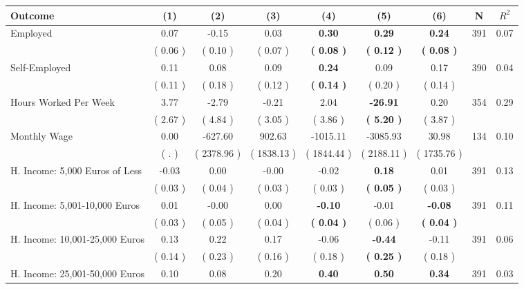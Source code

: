 \begin{tabular}{lcccccccc}
\toprule
 \textbf{Outcome} & \textbf{(1)} & \textbf{(2)} & \textbf{(3)} & \textbf{(4)} & \textbf{(5)} & \textbf{(6)} & \textbf{N} & \textbf{$ R^2$} \\
\midrule
Employed &      0.07 &     -0.15 &      0.03 & \textbf{     0.30} & \textbf{     0.29} & \textbf{     0.24} & 391 &       0.07 \\ 
 & (     0.06 ) & (     0.10 ) & (     0.07 ) & \textbf{(     0.08 )} & \textbf{(     0.12 )} & \textbf{(     0.08 )} & \\
Self-Employed &      0.11 &      0.08 &      0.09 & \textbf{     0.24} &      0.09 &      0.17 & 390 &       0.04 \\ 
 & (     0.11 ) & (     0.18 ) & (     0.12 ) & \textbf{(     0.14 )} & (     0.20 ) & (     0.14 ) & \\
Hours Worked Per Week &      3.77 &     -2.79 &     -0.21 &      2.04 & \textbf{   -26.91} &      0.20 & 354 &       0.29 \\ 
 & (     2.67 ) & (     4.84 ) & (     3.05 ) & (     3.86 ) & \textbf{(     5.20 )} & (     3.87 ) & \\
Monthly Wage &      0.00 &   -627.60 &    902.63 &  -1015.11 &  -3085.93 &     30.98 & 134 &       0.10 \\ 
 & (        . ) & (  2378.96 ) & (  1838.13 ) & (  1844.44 ) & (  2188.11 ) & (  1735.76 ) & \\
H. Income: 5,000 Euros of Less &     -0.03 &      0.00 &     -0.00 &     -0.02 & \textbf{     0.18} &      0.01 & 391 &       0.13 \\ 
 & (     0.03 ) & (     0.04 ) & (     0.03 ) & (     0.03 ) & \textbf{(     0.05 )} & (     0.03 ) & \\
H. Income: 5,001-10,000 Euros &      0.01 &     -0.00 &      0.00 & \textbf{    -0.10} &     -0.01 & \textbf{    -0.08} & 391 &       0.11 \\ 
 & (     0.03 ) & (     0.05 ) & (     0.04 ) & \textbf{(     0.04 )} & (     0.06 ) & \textbf{(     0.04 )} & \\
H. Income: 10,001-25,000 Euros &      0.13 &      0.22 &      0.17 &     -0.06 & \textbf{    -0.44} &     -0.11 & 391 &       0.06 \\ 
 & (     0.14 ) & (     0.23 ) & (     0.16 ) & (     0.18 ) & \textbf{(     0.25 )} & (     0.18 ) & \\
H. Income: 25,001-50,000 Euros &      0.10 &      0.08 &      0.20 & \textbf{     0.40} & \textbf{     0.50} & \textbf{     0.34} & 391 &       0.03 \\ 

\end{tabular}
